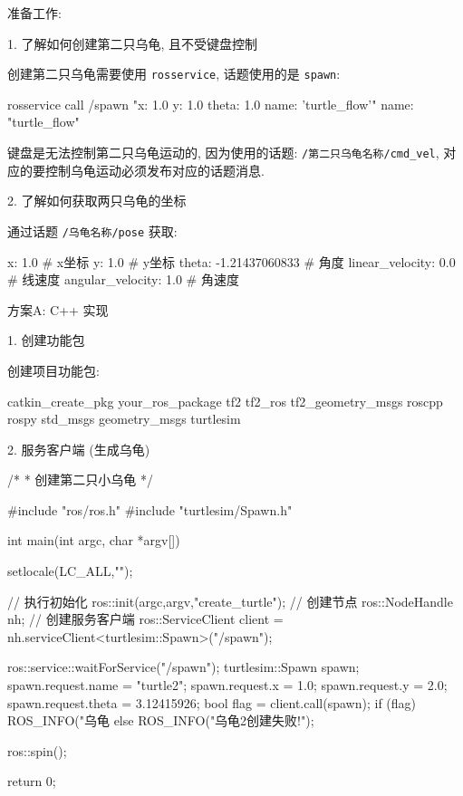 \documentclass[openany, fontset=windowsold]{ctexbook}
\theoremstyle{kaiti}
\theoremstyle{normal}
\begin{document}
准备工作:

1. 了解如何创建第二只乌龟, 且不受键盘控制

创建第二只乌龟需要使用 \verb|rosservice|, 话题使用的是 \verb|spawn|:

\begin{bash}
  rosservice call /spawn "x: 1.0
  y: 1.0
  theta: 1.0
  name: 'turtle_flow'" 
  name: "turtle_flow"
\end{bash}

键盘是无法控制第二只乌龟运动的, 因为使用的话题: \verb|/第二只乌龟名称/cmd_vel|, 对应的要控制乌龟运动必须发布对应的话题消息.

2. 了解如何获取两只乌龟的坐标

通过话题 \verb|/乌龟名称/pose| 获取:

\begin{bash}
  x: 1.0                  # x坐标
  y: 1.0                  # y坐标
  theta: -1.21437060833   # 角度
  linear_velocity: 0.0    # 线速度
  angular_velocity: 1.0   # 角速度
\end{bash}

方案A: C++ 实现

1. 创建功能包

创建项目功能包:

\begin{bash}
  catkin_create_pkg your_ros_package tf2 tf2_ros tf2_geometry_msgs roscpp rospy std_msgs geometry_msgs turtlesim
\end{bash}

2. 服务客户端 (生成乌龟)

\begin{cpp}
  /* 
   *  创建第二只小乌龟
   */

  #include "ros/ros.h"
  #include "turtlesim/Spawn.h"

  int main(int argc, char *argv[])
  {
      setlocale(LC_ALL,"");

      // 执行初始化
      ros::init(argc,argv,"create_turtle");
      // 创建节点
      ros::NodeHandle nh;
      // 创建服务客户端
      ros::ServiceClient client = nh.serviceClient<turtlesim::Spawn>("/spawn");

      ros::service::waitForService("/spawn");
      turtlesim::Spawn spawn;
      spawn.request.name = "turtle2";
      spawn.request.x = 1.0;
      spawn.request.y = 2.0;
      spawn.request.theta = 3.12415926;
      bool flag = client.call(spawn);
      if (flag)
      {
          ROS_INFO("乌龟%
      }
      else
      {
          ROS_INFO("乌龟2创建失败!");
      }

      ros::spin();

      return 0;
  }
\end{cpp}
\end{document}
